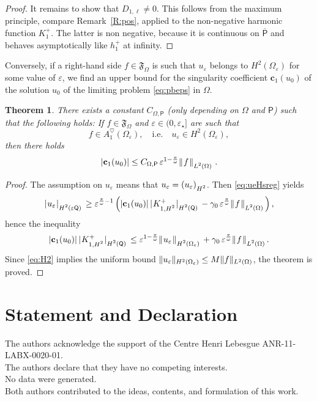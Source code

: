 \documentclass[titlepage,12pt]{amsart}
\newtheorem{theorem}{Theorem}[section]
\theoremstyle{definition}
\theoremstyle{remark}
\numberwithin{equation}{section}
\newcommand{\ee}{\hskip0.15ex}
\newcommand{\dd}[1]{_{\raise-0.6ex\hbox{$\scriptstyle #1$}}}
\newcommand {\Norm}[2]{ \mathchoice
    {|\ee #1\ee|\dd{#2}\,}
    {| #1 |_{#2}}
    {| #1 |_{#2}}
    {| #1 |_{#2}} }
\newcommand {\DNorm}[2]{ \mathchoice
    {\|\ee #1\ee\|\dd{#2}\,}
    {\| #1 \|_{#2}}
    {\| #1 \|_{#2}}
    {\| #1 \|_{#2}} }
\newcommand{\rP}{{\mathsf{P}}}
\newcommand{\rQ}{{\mathsf{Q}}}
\newcommand {\gF}{\mathfrak{F}}
\begin{document}
\begin{proof}
It remains to show that $D_{1,\ell}\ne0$. This follows from the maximum principle, compare Remark~\ref{R:pos}, applied to the non-negative harmonic function $K_{1}^{+}$. The latter is non negative, because it is continuous on $\overline{\rP}$ and behaves asymptotically like $h_{1}^{+}$ at infinity. 
\end{proof}


Conversely, if a right-hand side $f\in \gF_\Omega$ is such that $u_\varepsilon$ belongs to $H^2(\Omega_\varepsilon)$ for some value of $\varepsilon$, we find an upper bound for the singularity coefficient $\mathbf{c}_1(u_0)$ of the solution $u_0$ of the limiting problem \eqref{eq:pbeps} in $\Omega$. 

\begin{theorem}
\label{th:H2}
There exists a constant $C_{\Omega,\rP}$ (only depending on $\Omega$ and $\rP$) such that the following holds: If $f\in \gF_\Omega$ and $\varepsilon\in(0,\varepsilon_\star]$ are such that
\[
   f\in A_1^\heartsuit(\Omega_{\varepsilon}),\quad\mbox{i.e.}\quad
   u_\varepsilon\in H^2(\Omega_\varepsilon),
\]
then there holds
\begin{equation}
\label{eq:c1bis}
   |\mathbf{c}_1(u_0)| 
   \le C_{\Omega,\rP}\, \varepsilon^{1-\frac{\pi}{\omega}} \DNorm{f}{L^2(\Omega)} \,.
\end{equation}
\end{theorem}

\begin{proof}
The assumption on $u_\varepsilon$ means that $u_\varepsilon = (u_\varepsilon)\dd{H^2}$. Then \eqref{eq:ueHsreg} yields
\[
   \Norm{u_\varepsilon}{H^2(\varepsilon\rQ)} \ge 
   \varepsilon^{\frac{\pi}{\omega}-1} \left( 
   |\mathbf{c}_1(u_0)|\, \Norm{K^+\dd{1,H^2}}{H^{2}(\rQ)}
   - \gamma_0\,\varepsilon^{\frac{\pi}{\omega}} \DNorm{f}{L^2(\Omega)}
   \right),
\]
hence the inequality
\[
   |\mathbf{c}_1(u_0)|\, \Norm{K^+\dd{1,H^2}}{H^{2}(\rQ)}
   \le
   \varepsilon^{1-\frac{\pi}{\omega}} 
   \DNorm{u_\varepsilon}{H^2(\Omega_\varepsilon)} +
   \gamma_0\,\varepsilon^{\frac{\pi}{\omega}} \DNorm{f}{L^2(\Omega)}.
\]
Since \eqref{eq:H2} implies the uniform bound $\DNorm{u_\varepsilon}{H^2(\Omega_\varepsilon)}\le M\DNorm{f}{L^2(\Omega)}$, the theorem is proved.
\end{proof}

\section*{Statement and Declaration}
The authors acknowledge the support of the Centre Henri Lebesgue
ANR-11-LABX-0020-01.\\
The authors declare that they have no competing interests.\\
No data were generated.\\
Both authors contributed to the ideas, contents, and formulation of this work.
\end{document}
